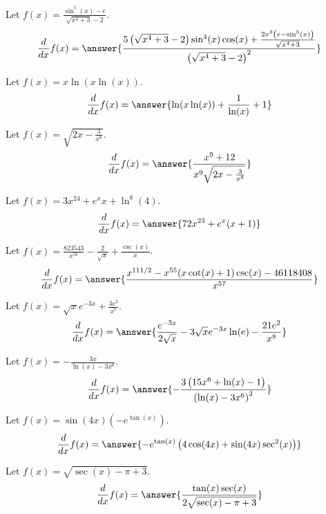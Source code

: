 \documentclass{ximera}
\begin{document}
\begin{shuffle}
\begin{exercise}
Let $f(x)=\frac{\sin ^5(x)-e}{\sqrt{x^4+3}-2}$.
\[
\ddx f(x) = \answer{\frac{5 \left(\sqrt{x^4+3}-2\right) \sin ^4(x) \cos (x)+\frac{2 x^3 \left(e-\sin ^5(x)\right)}{\sqrt{x^4+3}}}{\left(\sqrt{x^4+3}-2\right)^2}}
\]
\end{exercise}

\begin{exercise}
Let $f(x)=x \ln (x \ln (x))$.
\[
\ddx f(x) = \answer{\ln (x \ln (x))+\frac{1}{\ln (x)}+1}
\]
\end{exercise}

\begin{exercise}
Let $f(x)=\sqrt{2 x-\frac{3}{x^8}}$.
\[
\ddx f(x) = \answer{\frac{x^9+12}{x^9 \sqrt{2 x-\frac{3}{x^8}}}}
\]
\end{exercise}

\begin{exercise}
Let $f(x)=3 x^{24}+e^x x+\ln ^8(4)$.
\[
\ddx f(x) = \answer{72 x^{23}+e^x (x+1)}
\]
\end{exercise}

\begin{exercise}
Let $f(x)=\frac{823543}{x^{56}}-\frac{2}{\sqrt{x}}+\frac{\csc (x)}{x}$.
\[
\ddx f(x) = \answer{\frac{x^{111/2}-x^{55} (x \cot (x)+1) \csc (x)-46118408}{x^{57}}}
\]
\end{exercise}

\begin{exercise}
Let $f(x)=\sqrt{x} e^{-3 x}+\frac{3 e^2}{x^7}$.
\[
\ddx f(x) = \answer{\frac{e^{-3 x}}{2 \sqrt{x}}-3 \sqrt{x} e^{-3 x} \ln (e)-\frac{21 e^2}{x^8}}
\]
\end{exercise}

\begin{exercise}
Let $f(x)=-\frac{3 x}{\ln (x)-3 x^6}$.
\[
\ddx f(x) = \answer{-\frac{3 \left(15 x^6+\ln (x)-1\right)}{\left(\ln (x)-3 x^6\right)^2}}
\]
\end{exercise}

\begin{exercise}
Let $f(x)=\sin (4 x) \left(-e^{\tan (x)}\right)$.
\[
\ddx f(x) = \answer{-e^{\tan (x)} \left(4 \cos (4 x)+\sin (4 x) \sec ^2(x)\right)}
\]
\end{exercise}

\begin{exercise}
Let $f(x)=\sqrt{\sec (x)-\pi +3}$.
\[
\ddx f(x) = \answer{\frac{\tan (x) \sec (x)}{2 \sqrt{\sec (x)-\pi +3}}}
\]
\end{exercise}


\end{shuffle}
\end{document}

